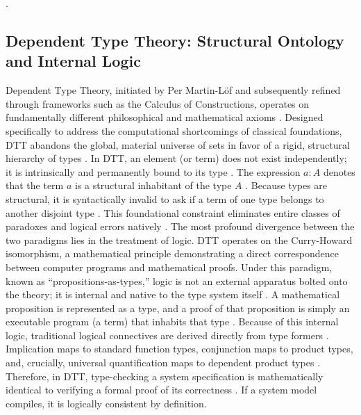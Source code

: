 \documentclass[11pt]{article}
\begin{document}
\parencite{Ref17}.\subsection{Dependent Type Theory: Structural Ontology and Internal Logic}
Dependent Type Theory, initiated by Per Martin-Löf and subsequently refined through frameworks such as the Calculus of Constructions, operates on fundamentally different philosophical and mathematical axioms \parencite{Ref18, Ref19, Ref20}. Designed specifically to address the computational shortcomings of classical foundations, DTT abandons the global, material universe of sets in favor of a rigid, structural hierarchy of types \parencite{Ref28}. In DTT, an element (or term) does not exist independently; it is intrinsically and permanently bound to its type \parencite{Ref16, Ref18}. The expression $a : A$ denotes that the term $a$ is a structural inhabitant of the type $A$ \parencite{Ref18}. Because types are structural, it is syntactically invalid to ask if a term of one type belongs to another disjoint type \parencite{Ref18}. This foundational constraint eliminates entire classes of paradoxes and logical errors natively \parencite{Ref25}. The most profound divergence between the two paradigms lies in the treatment of logic. DTT operates on the Curry-Howard isomorphism, a mathematical principle demonstrating a direct correspondence between computer programs and mathematical proofs. Under this paradigm, known as ``propositions-as-types,'' logic is not an external apparatus bolted onto the theory; it is internal and native to the type system itself \parencite{Ref16, Ref23}. A mathematical proposition is represented as a type, and a proof of that proposition is simply an executable program (a term) that inhabits that type \parencite{Ref16}. Because of this internal logic, traditional logical connectives are derived directly from type formers \parencite{Ref23}. Implication maps to standard function types, conjunction maps to product types, and, crucially, universal quantification maps to dependent product types \parencite{Ref23, Ref29}. Therefore, in DTT, type-checking a system specification is mathematically identical to verifying a formal proof of its correctness \parencite{Ref22, Ref30}. If a system model compiles, it is logically consistent by definition.
\end{document}
